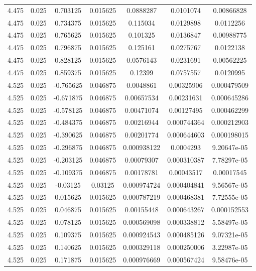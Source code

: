 \begin{table}[bh]
\begin{center}
{\begin{tabular}{ccccccc}
4.475	 & 0.025 & 	0.703125	 & 0.015625	 & 0.0888287	 & 0.0101074	 & 0.00866828 \\ 
4.475	 & 0.025 & 	0.734375	 & 0.015625	 & 0.115034	 & 0.0129898	 & 0.0112256 \\ 
4.475	 & 0.025 & 	0.765625	 & 0.015625	 & 0.101325	 & 0.0136847	 & 0.00988775 \\ 
4.475	 & 0.025 & 	0.796875	 & 0.015625	 & 0.125161	 & 0.0275767	 & 0.0122138 \\ 
4.475	 & 0.025 & 	0.828125	 & 0.015625	 & 0.0576143	 & 0.0231691	 & 0.00562225 \\ 
4.475	 & 0.025 & 	0.859375	 & 0.015625	 & 0.12399	 & 0.0757557	 & 0.0120995 \\ 
4.525	 & 0.025 & 	-0.765625	 & 0.046875	 & 0.0048861	 & 0.00325906	 & 0.000479509 \\ 
4.525	 & 0.025 & 	-0.671875	 & 0.046875	 & 0.00657534	 & 0.00231631	 & 0.000645286 \\ 
4.525	 & 0.025 & 	-0.578125	 & 0.046875	 & 0.00471074	 & 0.00127495	 & 0.000462299 \\ 
4.525	 & 0.025 & 	-0.484375	 & 0.046875	 & 0.00216944	 & 0.000744364	 & 0.000212903 \\ 
4.525	 & 0.025 & 	-0.390625	 & 0.046875	 & 0.00201774	 & 0.000644603	 & 0.000198015 \\ 
4.525	 & 0.025 & 	-0.296875	 & 0.046875	 & 0.000938122	 & 0.0004293	 & 9.20647e-05 \\ 
4.525	 & 0.025 & 	-0.203125	 & 0.046875	 & 0.00079307	 & 0.000310387	 & 7.78297e-05 \\ 
4.525	 & 0.025 & 	-0.109375	 & 0.046875	 & 0.00178781	 & 0.00043517	 & 0.00017545 \\ 
4.525	 & 0.025 & 	-0.03125	 & 0.03125	 & 0.000974724	 & 0.000404841	 & 9.56567e-05 \\ 
4.525	 & 0.025 & 	0.015625	 & 0.015625	 & 0.000787219	 & 0.000468381	 & 7.72555e-05 \\ 
4.525	 & 0.025 & 	0.046875	 & 0.015625	 & 0.00155448	 & 0.000643267	 & 0.000152553 \\ 
4.525	 & 0.025 & 	0.078125	 & 0.015625	 & 0.000569098	 & 0.000338812	 & 5.58497e-05 \\ 
4.525	 & 0.025 & 	0.109375	 & 0.015625	 & 0.000924543	 & 0.000485126	 & 9.07321e-05 \\ 
4.525	 & 0.025 & 	0.140625	 & 0.015625	 & 0.000329118	 & 0.000250006	 & 3.22987e-05 \\ 
4.525	 & 0.025 & 	0.171875	 & 0.015625	 & 0.000976669	 & 0.000567424	 & 9.58476e-05 \\ 

\end{tabular}}
\end{center}
\end{table}
